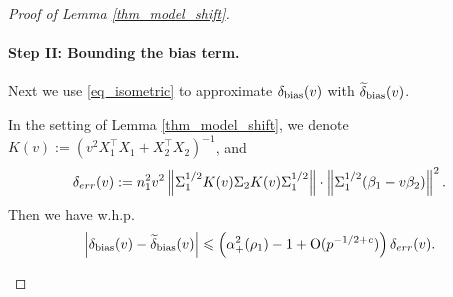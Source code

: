 \begin{proof}[Proof of Lemma \ref{thm_model_shift}]
\paragraph{Step II: Bounding the bias term.}
Next we use \eqref{eq_isometric} to approximate $\delta_{\text{bias}}(v)$ with $\widetilde\delta_{\text{bias}}(v)$. %
\begin{claim}\label{prop_model_shift}
	In the setting of Lemma \ref{thm_model_shift},
	we denote $K(v) := (v^2X_1^{\top}X_1 + X_2^{\top}X_2)^{-1}$, and
	\begin{align*}
		\delta_{err}(v) := n_1^2 v^2 \left\| \Sigma_1^{1/2} K(v) \Sigma_2 K(v) \Sigma_1^{1/2} \right\| \cdot \left\| \Sigma_1^{1/2} (\beta_1 - v\beta_2) \right\|^2.
	\end{align*}
	Then we have w.h.p.
	\begin{align*}
		 \left| \delta_{\text{bias}}(v)-\widetilde\delta_{\text{bias}}(v)\right| 
		\leqslant  \left( \alpha_+^2(\rho_1)-1 + \operatorname{O}(p^{-1/2+{\mathit{c}}})\right)\delta_{err}(v).
	\end{align*}
\end{claim}


\end{proof}
